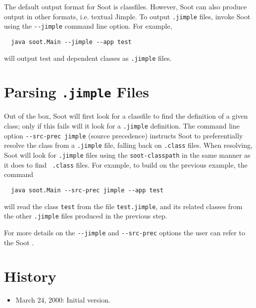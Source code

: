\documentclass[11pt]{article}
\begin{document}
The default output format for Soot is classfiles. However, Soot can
also produce output in other formats, i.e. textual Jimple. To output
{\tt .jimple} files, invoke Soot using the {\tt -}{\tt -jimple} command line
option. For example,

\begin{verbatim}
  java soot.Main --jimple --app test
\end{verbatim}

will output test and dependent classes as {\tt .jimple} files.

\section{Parsing {\tt .jimple} Files}

Out of the box, Soot will first look for a classfile to find the
definition of a given class; only if this fails will it look for a
{\tt .jimple} definition. The command line option {\tt -}{\tt -src-prec
jimple} (source precedence) instructs Soot to preferentially resolve
the class from a {\tt .jimple} file, falling back on {\tt .class}
files.  When resolving, Soot will look for {\tt .jimple} files using
the {\tt soot-classpath} in the same manner as it does to find {\tt
.class} files. For example, to build on the previous example, the
command

\begin{verbatim}
  java soot.Main --src-prec jimple --app test
\end{verbatim}

will read the class {\tt test} from the file {\tt test.jimple}, and its
related classes from the other {\tt .jimple} files produced in the previous
step.

For more details on the {\tt -}{\tt -jimple} and {\tt -}{\tt -src-prec} options
the user can refer to the Soot .

\section*{History}
\begin{itemize}
\item March 24, 2000: Initial version.
\end{itemize}
\end{document}
